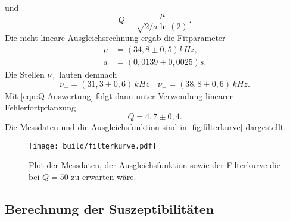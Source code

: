 und 
\begin{equation}
	\label{eqn:Q-Auswertung}
	Q = \frac{\mu}{\sqrt{2/a \ln(2)}}.
\end{equation}
Die nicht lineare Ausgleichsrechnung ergab die Fitparameter
\begin{align}
	\label{eqn:fit-ergebnisse}
	\mu &= (34,8 \pm 0,5) \si{kHz}, \\
	a &= (0,0139 \pm 0,0025) \si{s}.%
\end{align}
Die Stellen $\nu_\pm$ lauten demnach
\begin{equation}
	\label{eqn:ausw:nu_pm}
	\nu_- = (31,3 \pm 0,6) \,\si{kHz}
	\quad
	\nu_+ = (38,8 \pm 0,6) \,\si{kHz}.
\end{equation}
Mit \autoref{eqn:Q-Auswertung} folgt dann unter Verwendung linearer Fehlerfortpflanzung
\begin{equation}
	Q = 4,7 \pm 0,4.
\end{equation}
Die Messdaten und die Ausgleichsfunktion sind in \autoref{fig:filterkurve} dargestellt.
\begin{figure}
	\texttt{[image: build/filterkurve.pdf]}
	\caption{Plot der Messdaten, der Ausgleichsfunktion sowie der Filterkurve die bei
	$Q=50$ zu erwarten wäre.}
	\label{fig:filterkurve}
\end{figure}

\subsection{Berechnung der Suszeptibilitäten}
\label{sec:Berechnung der Suszeptibilitäten}

